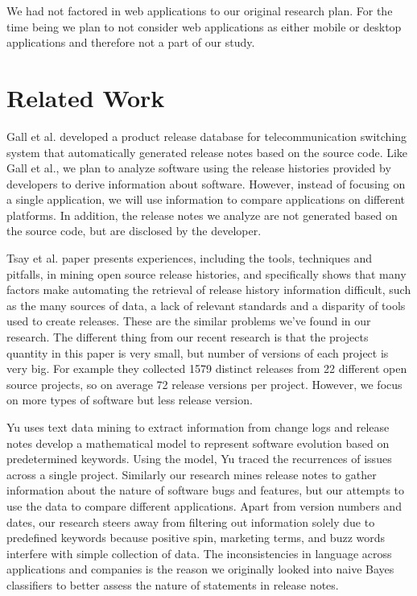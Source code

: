 \documentclass{acm_proc_article-sp}
\begin{document}
We had not factored in web applications to our original research plan. For the time being we plan to not consider web applications as either mobile or desktop applications and therefore not a part of our study.


\section{Related Work}

Gall et al. \cite{GallSoftwareEv} developed a product release database for telecommunication switching system that automatically generated release notes based on the source code.
Like Gall et al., we plan to analyze software using the release histories provided by developers to derive information about software. 
However, instead of focusing on a single application, we will use information to compare applications on different platforms. 
In addition, the release notes we analyze are not generated based on the source code, but are disclosed by the developer.

Tsay et al. \cite{TsayOpenSourceMining} paper presents experiences, including the tools, techniques and pitfalls, in mining open source release histories, and specifically shows that many factors make automating the retrieval of release history information difficult, such as the many sources of data, a lack of relevant standards and a disparity of tools used to create releases. These are the similar problems we've found in our research.
The different thing from our recent research is that the projects quantity in this paper is very small, but number of versions of each project is very big. For example they collected 1579 distinct releases from 22 different open source projects, so on average 72 release versions per project. However, we focus on more types of software but less release version.

Yu \cite{YuChangeLogs} uses text data mining to extract information from change logs and release notes develop a mathematical model to represent software evolution based on predetermined keywords. Using the model, Yu traced the recurrences of issues across a single project.
Similarly our research mines release notes to gather information about the nature of software bugs and features, but our attempts to use the data to compare different applications. 
Apart from version numbers and dates, our research steers away from filtering out information solely due to predefined keywords because positive spin, marketing terms, and buzz words interfere with simple collection of data. 
The inconsistencies in language across applications and companies is the reason we originally looked into naive Bayes classifiers to better assess the nature of statements in release notes.



\end{document}

